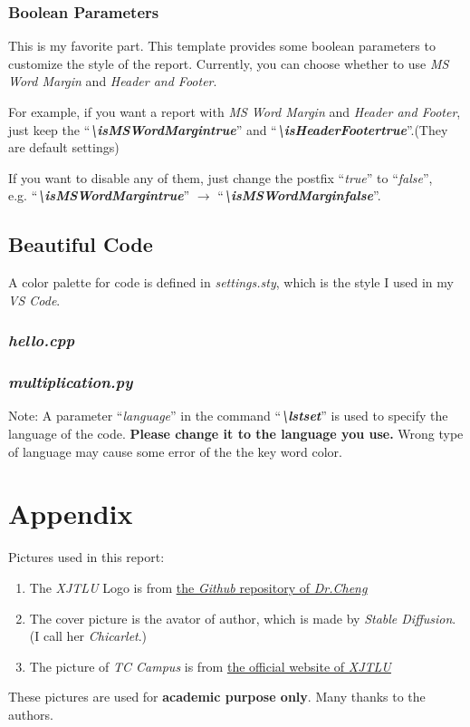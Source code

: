 \documentclass{article}
\begin{document}
\subsubsection{Boolean Parameters}
This is my favorite part. This template provides some boolean parameters to customize the style of the report.
Currently, you can choose whether to use \textit{MS Word Margin} and \textit{Header and Footer}.\par
For example, if you want a report with \textit{MS Word Margin} and \textit{Header and Footer}, 
just keep the ``\textit{\textbf{\textbackslash isMSWordMargintrue}}'' and ``\textit{\textbf{\textbackslash isHeaderFootertrue}}''.(They are default settings)\par
If you want to disable any of them, just change the postfix ``\textit{true}'' to ``\textit{false}'', \\ 
e.g. ``\textit{\textbf{\textbackslash isMSWordMargintrue}}'' \(\rightarrow\) ``\textit{\textbf{\textbackslash isMSWordMarginfalse}}''.

\subsection{Beautiful Code}
\noindent A color palette for code is defined in \textit{settings.sty}, which is the style I used in my \textit{VS Code}.
\subsubsection{\textit{hello.cpp}}


\subsubsection{\textit{multiplication.py}}


\noindent Note: A parameter ``\textit{language}'' in the command ``\textit{\textbf{\textbackslash lstset}}'' is used to specify the language of the code. 
\textbf{Please change it to the language you use.} 
Wrong type of language may cause some error of the the key word color.

\newpage
\section{Appendix}
\noindent Pictures used in this report:
\begin{enumerate}
    \item The \textit{XJTLU} Logo is from \href{https://github.com/feimax/latex_template_for_xjtlu_eee_light}{\underline{the \textit{Github} repository of \textit{Dr.Cheng}}}
    \item The cover picture is the avator of author, which is made by \textit{Stable Diffusion}. (I call her \textit{Chicarlet}.)
    \item The picture of \textit{TC Campus} is from \href{https://www.xjtlu.edu.cn/en/study/departments/entrepreneurship-and-enterprise-hub}{\underline{the official website of \textit{XJTLU}}}
\end{enumerate}

\noindent These pictures are used for \textbf{academic purpose only}. Many thanks to the authors.

\newpage


\end{document}
